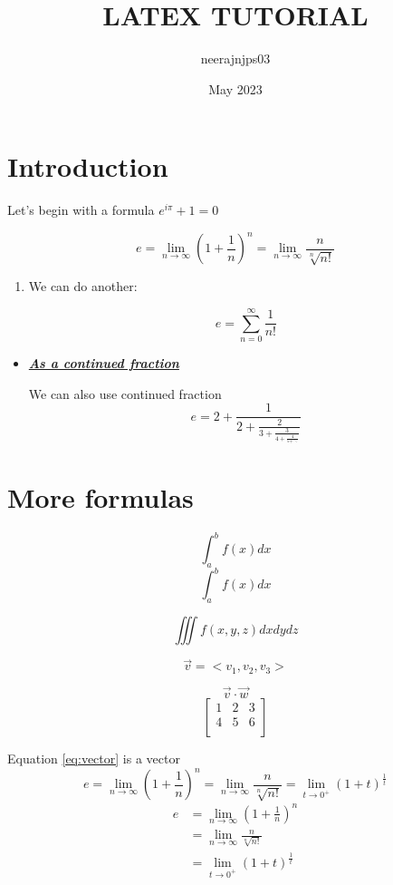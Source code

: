 \documentclass{article}
\title{LATEX TUTORIAL}
\author{neerajnjps03 }
\date{May 2023}
\begin{document}
\maketitle

\section{Introduction}
Let's begin with a formula $e^{i\pi} + 1 = 0$

$$e = \lim_{n\to\infty}\left(1 + \frac{1}{n}\right)^n 
 = \lim_{n\to\infty}\frac{n}{\sqrt[n]{n!}}$$
\begin{enumerate}
    \item 
	We can do another:

 $$
    e = \sum_{n=0}^{\infty} \frac{1}{n!}
 $$
\end{enumerate}
\begin{itemize}
    \item \underline{\textit{\textbf{As a continued fraction}}}

    
We can also use continued fraction
$$
    e = 2 + \frac{1}{2 + \frac{2}{3 + \frac{3}{4 + \frac{4}{5 + \ddots}}}}
$$
\end{itemize}

\section*{More formulas}

$$
    \int_a^bf(x)dx
$$
\[
    \int_a^bf(x)dx
\]


\begin{equation}
  \iiint f(x, y, z) dxdydz
  \label{triple_integral}
\end{equation}


\begin{equation}
\label{eq:vector}
    \Vec{v} = <v_1, v_2, v_3 >
\end{equation}

$$
    \Vec{v}\cdot\Vec{w}
$$
$$
    \begin{bmatrix}
        1 & 2 & 3 \\
        4 & 5 & 6 \\
    \end{bmatrix}
$$

Equation \ref{eq:vector} is a vector
\begin{equation}
e = \lim_{n\to\infty}\left(1 + \frac{1}{n}\right)^n 
 = \lim_{n\to\infty}\frac{n}{\sqrt[n]{n!}}
 =\lim_{t\to{0^+}}(1+t)^{\frac{1}{t}}
\end{equation}
\begin{align}
e & = \lim_{n\to\infty}\left(1 + \frac{1}{n}\right)^n \\
 &= \lim_{n\to\infty}\frac{n}{\sqrt[n]{n!}} \\
 &=\lim_{t\to{0^+}}(1+t)^{\frac{1}{t}}
\end{align}
\end{document}
